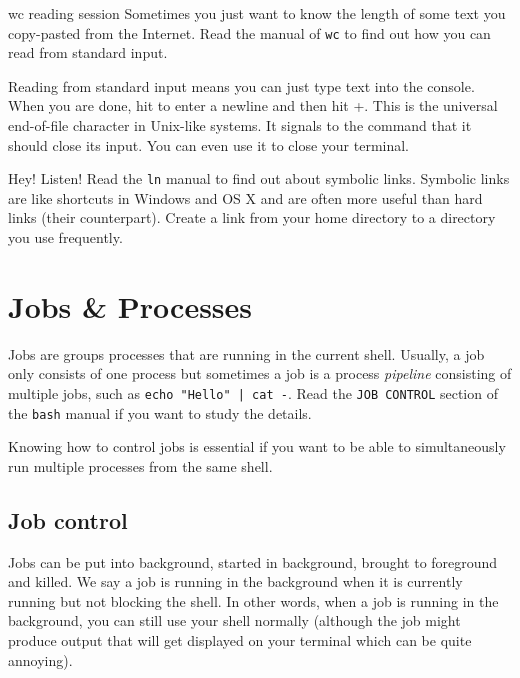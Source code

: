 \documentclass{TheAlternativeCourse}
\begin{document}
\begin{exercisebox}{wc reading session}
	Sometimes you just want to know the length of some text you copy-pasted from the Internet. Read the manual of \texttt{wc} to find out how you can read from standard input.
\end{exercisebox}
\begin{hintbox}
	Reading from standard input means you can just type text into the console. When you are done, hit  to enter a newline and then hit \keys{\ctrl}+. This is the universal end-of-file character in Unix-like systems. It signals to the command that it should close its input. You can even use it to close your terminal.
\end{hintbox}

\begin{exercisebox}{Hey! Listen!}
	Read the \texttt{ln} manual to find out about symbolic links. Symbolic links are like shortcuts in Windows and OS X and are often more useful than hard links (their counterpart). Create a link from your home directory to a directory you use frequently.
\end{exercisebox}
	
\section{Jobs \& Processes}

Jobs are groups processes that are running in the current shell. Usually, a job only consists of one process but sometimes a job is a process \emph{pipeline} consisting of multiple jobs, such as \texttt{echo "Hello" | cat -}. Read the \texttt{JOB CONTROL} section of the \texttt{bash} manual if you want to study the details.

Knowing how to control jobs is essential if you want to be able to simultaneously run multiple processes from the same shell.

\subsection{Job control}
Jobs can be put into background, started in background, brought to foreground and killed. We say a job is running in the background when it is currently running but not blocking the shell. In other words, when a job is running in the background, you can still use your shell normally (although the job might produce output that will get displayed on your terminal which can be quite annoying).
\end{document}
